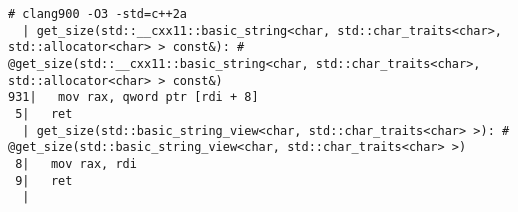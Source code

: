 \begin{lstlisting}[language={},numbers=none,title=\href{https://godbolt.org/z/jGEfq8}{\texttt{godbolt.org/z/jGEfq8}}]
# clang900 -O3 -std=c++2a
  | get_size(std::__cxx11::basic_string<char, std::char_traits<char>, std::allocator<char> > const&): # @get_size(std::__cxx11::basic_string<char, std::char_traits<char>, std::allocator<char> > const&)
931|   mov rax, qword ptr [rdi + 8]
 5|   ret
  | get_size(std::basic_string_view<char, std::char_traits<char> >): # @get_size(std::basic_string_view<char, std::char_traits<char> >)
 8|   mov rax, rdi
 9|   ret
  |
\end{lstlisting}
